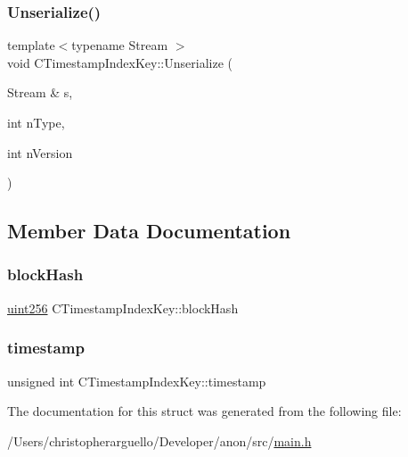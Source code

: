 \mbox{\label{struct_c_timestamp_index_key_aeafbd5739644dd4fdbc5d608cca05bd3}} 
\subsubsection{\texorpdfstring{Unserialize()}{Unserialize()}}
{\footnotesize\ttfamily template$<$typename Stream $>$ \\
void C\+Timestamp\+Index\+Key\+::\+Unserialize (\begin{DoxyParamCaption}\item[{Stream \&}]{s,  }\item[{int}]{n\+Type,  }\item[{int}]{n\+Version }\end{DoxyParamCaption})\hspace{0.3cm}{\ttfamily [inline]}}



\subsection{Member Data Documentation}
\mbox{\label{struct_c_timestamp_index_key_a283807e42c308d1998b226ec30352239}} 
\subsubsection{\texorpdfstring{block\+Hash}{blockHash}}
{\footnotesize\ttfamily \mbox{\hyperlink{classuint256}{uint256}} C\+Timestamp\+Index\+Key\+::block\+Hash}

\mbox{\label{struct_c_timestamp_index_key_ad8558ff210c520bb1a0ff41c0ccd6867}} 
\subsubsection{\texorpdfstring{timestamp}{timestamp}}
{\footnotesize\ttfamily unsigned int C\+Timestamp\+Index\+Key\+::timestamp}



The documentation for this struct was generated from the following file\+:\begin{DoxyCompactItemize}
\item 
/\+Users/christopherarguello/\+Developer/anon/src/\mbox{\hyperlink{main_8h}{main.\+h}}\end{DoxyCompactItemize}
